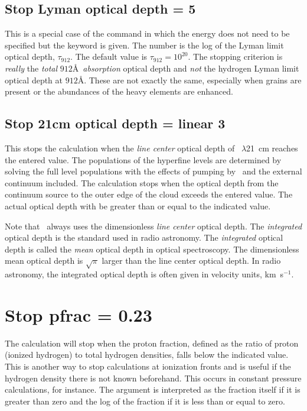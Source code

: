 \subsection{Stop Lyman optical depth = 5}

This is a special case of the  command
in which the
energy does not need to be specified but the keyword  is given.
The
number is the log of the Lyman limit optical depth, $\tau_{912}$.
The default value
is $\tau_{912} = 10^{20}$.
The stopping criterion is \emph{really} the
\emph{total} $912$\AA\ \emph{absorption}
optical depth and \emph{not} the hydrogen Lyman limit optical depth at $912$\AA.
These are not exactly the same, especially when grains
are present or the
abundances of the heavy elements are enhanced.

\subsection{Stop 21cm optical depth = linear 3}

This stops the calculation when the \emph{line center} optical depth of \hi\ $\lambda$21~cm reaches the entered value.
The populations of the hyperfine levels
are determined by solving the full level populations with the effects of
pumping by \la\ and the external continuum included.
The calculation stops
when the optical depth from the continuum source to the outer edge of the
cloud exceeds the entered value.
The actual optical depth with be greater
than or equal to the indicated value.

Note that \Cloudy\ always uses the dimensionless \emph{line center}
optical depth.
The \emph{integrated} optical depth is the standard used
in radio astronomy.
The
\emph{integrated} optical depth is called the \emph{mean} optical depth in optical
spectroscopy.
The dimensionless mean optical depth is $\sqrt \pi  $
larger than the line center optical depth.
In radio astronomy, the
integrated optical depth is often given in velocity units, km~s$^{-1}$.

\section{Stop pfrac = 0.23}

The calculation will stop when the proton fraction, defined as the ratio
of proton (ionized hydrogen) to total hydrogen densities, falls below the
indicated value.
This is another way to stop calculations at ionization
fronts and is useful if the hydrogen density there is not known beforehand.
This occurs in constant pressure calculations, for instance.
The argument
is interpreted as the fraction itself if it is greater than zero
and the
log of the fraction if it is less than or equal to zero.

